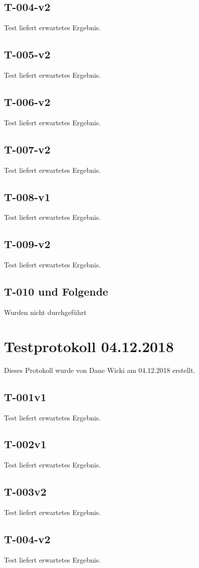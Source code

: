 \documentclass[a4paper]{scrreprt}
\begin{document}
\subsection*{T-004-v2}
Test liefert erwartetes Ergebnis.
\subsection*{T-005-v2}
Test liefert erwartetes Ergebnis.
\subsection*{T-006-v2}
Test liefert erwartetes Ergebnis.
\subsection*{T-007-v2}
Test liefert erwartetes Ergebnis.
\subsection*{T-008-v1}
Test liefert erwartetes Ergebnis.
\subsection*{T-009-v2}
Test liefert erwartetes Ergebnis.
\subsection*{T-010 und Folgende}
Wurden nicht durchgeführt
\section*{Testprotokoll 04.12.2018}
Dieses Protokoll wurde von Dane Wicki am 04.12.2018 erstellt.
\subsection*{T-001v1}
Test liefert erwartetes Ergebnis.
\subsection*{T-002v1}
Test liefert erwartetes Ergebnis.
\subsection*{T-003v2}
Test liefert erwartetes Ergebnis.
\subsection*{T-004-v2}
Test liefert erwartetes Ergebnis.
\end{document}
